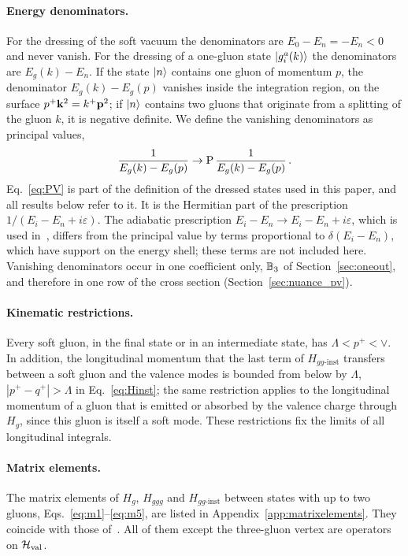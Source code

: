 \paragraph{Energy denominators.} For the dressing of the soft vacuum the denominators are $E_0-E_n=-E_n<0$ and never vanish. For the dressing of a one-gluon state $\ket{g^a_i(k)}$ the denominators are $E_g(k)-E_n$. If the state $\ket n$ contains one gluon of momentum $p$, the denominator $E_g(k)-E_g(p)$ vanishes inside the integration region, on the surface $p^+\mathbf{k}^2=k^+\mathbf{p}^2$; if $\ket n$ contains two gluons that originate from a splitting of the gluon $k$, it is negative definite. We define the vanishing denominators as principal values,
\begin{align}\label{eq:PV}
\frac{1}{E_g(k)-E_g(p)}\to\mathrm{P}\,\frac{1}{E_g(k)-E_g(p)}\,.
\end{align}
Eq.~\eqref{eq:PV} is part of the definition of the dressed states used in this paper, and all results below refer to it. It is the Hermitian part of the prescription $1/(E_i-E_n+i\varepsilon)$. The adiabatic prescription $E_i-E_n\to E_i-E_n+i\varepsilon$, which is used in~\cite{Radhakrishnan:2026soft}, differs from the principal value by terms proportional to $\delta(E_i-E_n)$, which have support on the energy shell; these terms are not included here. Vanishing denominators occur in one coefficient only, $\mathbb{B}_3$ of Section~\ref{sec:oneout}, and therefore in one row of the cross section (Section~\ref{sec:nuance_pv}).

\paragraph{Kinematic restrictions.} Every soft gluon, in the final state or in an intermediate state, has $\Lambda<p^+<\vee$. In addition, the longitudinal momentum that the last term of $H_{gg\text{-inst}}$ transfers between a soft gluon and the valence modes is bounded from below by $\Lambda$, $|p^+-q^+|>\Lambda$ in Eq.~\eqref{eq:Hinst}; the same restriction applies to the longitudinal momentum of a gluon that is emitted or absorbed by the valence charge through $H_g$, since this gluon is itself a soft mode. These restrictions fix the limits of all longitudinal integrals.

\paragraph{Matrix elements.} The matrix elements of $H_g$, $H_{ggg}$ and $H_{gg\text{-inst}}$ between states with up to two gluons, Eqs.~\eqref{eq:m1}--\eqref{eq:m5}, are listed in Appendix~\ref{app:matrixelements}. They coincide with those of~\cite{Lublinsky:2016meo}. All of them except the three-gluon vertex are operators on $\mathcal H_{\rm val}$.

